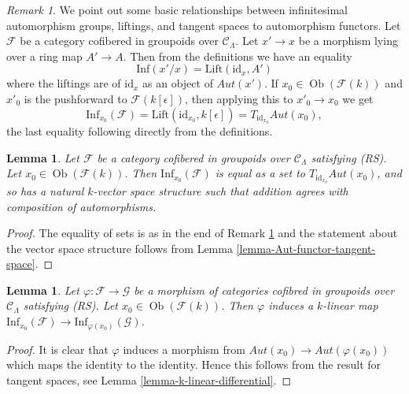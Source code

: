 \documentclass{stacks-project}
\theoremstyle{plain}
\newtheorem{lemma}[subsection]{Lemma}
\theoremstyle{definition}
\theoremstyle{remark}
\newtheorem{remark}[subsection]{Remark}
\numberwithin{equation}{subsection}
\def\Ob{\mathop{\mathrm{Ob}}\nolimits}
\begin{document}
\begin{remark}
\label{remark-infaut-lifting-equalities}
We point out some basic relationships between infinitesimal automorphism
groups, liftings, and tangent spaces to automorphism functors. Let
$\mathcal{F}$ be a category cofibered in groupoids over $\mathcal{C}_\Lambda$.
Let $x' \to x$ be a morphism lying over a ring map $A' \to A$.
Then from the definitions we have an equality
$$
\text{Inf}(x'/x) = \text{Lift}(\text{id}_x, A')
$$
where the liftings are of $\text{id}_x$ as an object of
$\mathit{Aut}(x')$.  If $x_0 \in \Ob(\mathcal{F}(k))$ and $x'_0$
is the pushforward to $\mathcal{F}(k[\epsilon])$, then applying this to
$x'_0 \to x_0$ we get
$$
\text{Inf}_{x_0}(\mathcal{F}) =
\text{Lift}(\text{id}_{x_0}, k[\epsilon]) =
T_{\text{id}_{x_0}} \mathit{Aut}(x_0),
$$
the last equality following directly from the definitions.
\end{remark}

\begin{lemma}
\label{lemma-infaut-vector-space}
Let $\mathcal{F}$ be a category cofibered in groupoids over
$\mathcal{C}_\Lambda$ satisfying (RS). Let $x_0 \in \Ob(\mathcal{F}(k))$.
Then $\text{Inf}_{x_0}(\mathcal{F})$ is equal as a set to
$T_{\text{id}_{x_0}} \mathit{Aut}(x_0)$, and so has a natural $k$-vector
space structure such that addition agrees with composition of automorphisms.
\end{lemma}

\begin{proof}
The equality of sets is as in the end of
Remark \ref{remark-infaut-lifting-equalities}
and the statement about the vector space structure follows from
Lemma \ref{lemma-Aut-functor-tangent-space}.
\end{proof}

\begin{lemma}
\label{lemma-k-linear-infaut}
Let $\varphi : \mathcal{F} \to \mathcal{G}$ be a morphism of categories
cofibred in groupoids over $\mathcal{C}_\Lambda$ satisfying (RS).
Let $x_0 \in \Ob(\mathcal{F}(k))$. Then $\varphi$ induces a $k$-linear
map $\text{Inf}_{x_0}(\mathcal{F}) \to \text{Inf}_{\varphi(x_0)}(\mathcal{G})$.
\end{lemma}

\begin{proof}
It is clear that $\varphi$ induces a morphism from
$\mathit{Aut}(x_0) \to \mathit{Aut}(\varphi(x_0))$
which maps the identity to the identity. Hence this follows from
the result for tangent spaces, see
Lemma \ref{lemma-k-linear-differential}.
\end{proof}
\end{document}
